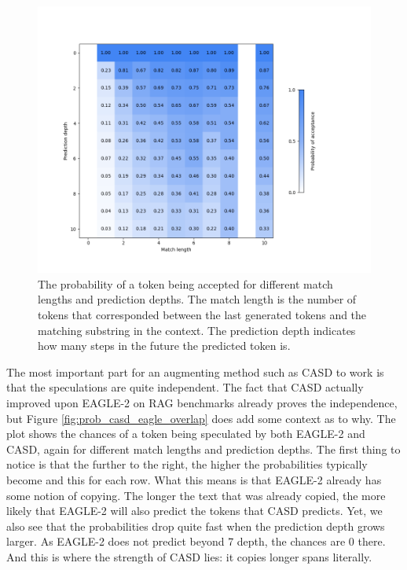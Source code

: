 \begin{figure}[h]
  \centering
  \includegraphics[width=\linewidth]{fig/prob_casd_accept.png}
  \caption{The probability of a token being accepted for different match lengths and prediction depths. The match length is the number of tokens that corresponded between the last generated tokens and the matching substring in the context. The prediction depth indicates how many steps in the future the predicted token is.}
  \label{fig:prob_casd_accept}
\end{figure}

The most important part for an augmenting method such as CASD to work is that the speculations are quite independent. The fact that CASD actually improved upon EAGLE-2 on RAG benchmarks already proves the independence, but Figure \ref{fig:prob_casd_eagle_overlap} does add some context as to why. The plot shows the chances of a token being speculated by both EAGLE-2 and CASD, again for different match lengths and prediction depths. The first thing to notice is that the further to the right, the higher the probabilities typically become and this for each row. What this means is that EAGLE-2 already has some notion of copying. The longer the text that was already copied, the more likely that EAGLE-2 will also predict the tokens that CASD predicts. Yet, we also see that the probabilities drop quite fast when the prediction depth grows larger. As EAGLE-2 does not predict beyond 7 depth, the chances are 0 there. And this is where the strength of CASD lies: it copies longer spans literally.

